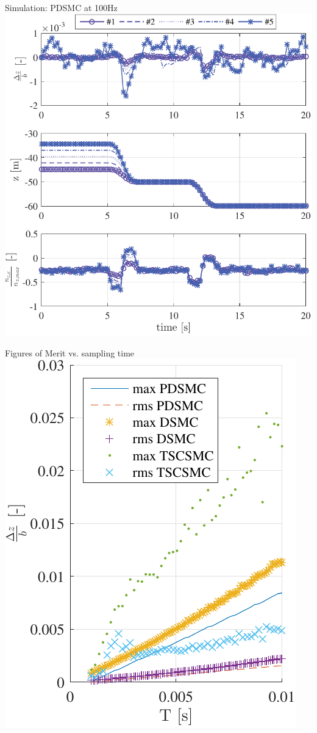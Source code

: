 \documentclass[12pt,svgnames,table,draft=false]{beamer}
\begin{document}
\begin{frame}{Simulation: PDSMC at 100Hz}
\centering
\includegraphics[height=.6\paperwidth]{PDSMC-100Hz-TIMESCALESEPARATION-turbulence=1}    %
\end{frame}

\begin{frame}{Figures of Merit vs. sampling time}
\centering
\includegraphics[height=0.8\paperheight]{error-z-vs-samplingtime.pdf}    
\end{frame}
\end{document}
